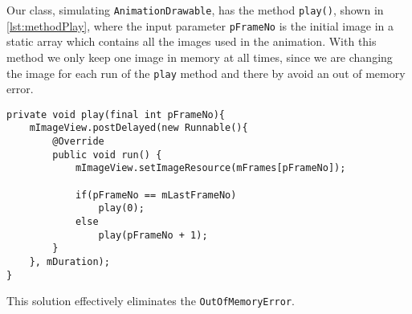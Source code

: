 Our class, simulating \lstinline{AnimationDrawable}, has the method \lstinline{play()}, shown in \cref{lst:methodPlay}, where the input parameter \lstinline{pFrameNo} is the initial image in a static array which contains all the images used in the animation. 
With this method we only keep one image in memory at all times, since we are changing the image for each run of the \lstinline{play} method and there by avoid an out of memory error.

\begin{lstlisting}[caption={Improved implementation of handling the animation.},label={lst:methodPlay}]
private void play(final int pFrameNo){
    mImageView.postDelayed(new Runnable(){
        @Override
        public void run() {                    
            mImageView.setImageResource(mFrames[pFrameNo]);

            if(pFrameNo == mLastFrameNo)
                play(0);
            else
                play(pFrameNo + 1);
        }
    }, mDuration);
}        
\end{lstlisting}

This solution effectively eliminates the \lstinline|OutOfMemoryError|.
